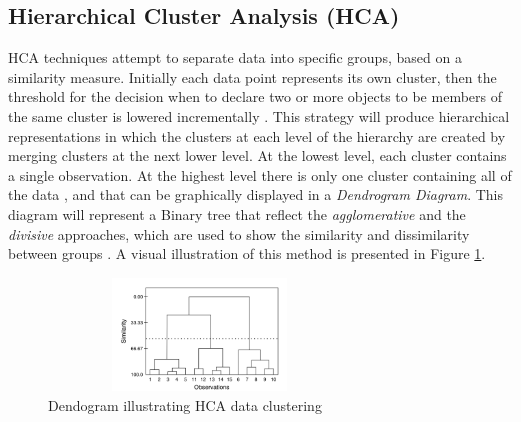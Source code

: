 \documentclass[letterpaper, 10 pt, conference]{ieeeconf}  %
\begin{document}
\subsection{Hierarchical Cluster Analysis (HCA)}
HCA techniques attempt to separate data into specific groups, based on a similarity measure. Initially each data point represents its own cluster, then the threshold for the decision when to declare two or more objects to be members of the same cluster is lowered incrementally \cite{Scott2006} \cite{Ramasubramanian2017}. This strategy will produce hierarchical representations in which
the clusters at each level of the hierarchy are created by merging clusters at the next lower level. At the lowest level, each cluster contains a single observation. At the highest level there is only one cluster containing all of the data \cite{Hastie2009}, and that can be graphically displayed in a \textit{Dendrogram Diagram}. This diagram will represent a Binary tree that reflect the \textit{agglomerative} and the \textit{divisive} approaches, which are used to show the similarity and dissimilarity between groups \cite{Scott2006} \cite{Hastie2009}. A visual illustration of this method is presented in Figure \ref{1234}.
\begin{figure}[thpb]
   	\includegraphics[width=8cm,height=3cm]{1234.png}
      \caption{Dendogram illustrating HCA data clustering\cite{Scott2006}}
      \label{1234}
   \end{figure} 
\end{document}
